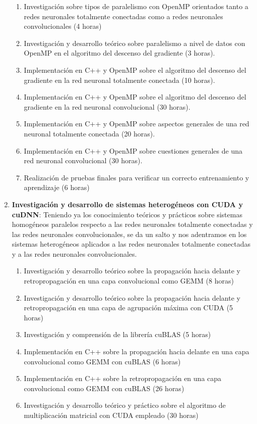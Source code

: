 \begin{enumerate}[label=\textbullet]
\begin{enumerate}[label=\textbullet]
		\item Investigación sobre tipos de paralelismo con OpenMP orientados tanto a redes neuronales totalmente conectadas como a redes neuronales convolucionales (4 horas)
		\item Investigación y desarrollo teórico sobre paralelismo a nivel de datos con OpenMP en el algoritmo del descenso del gradiente (3 horas).
		\item Implementación en C++ y OpenMP sobre el algoritmo del descenso del gradiente en la red neuronal totalmente conectada (10 horas).
		\item Implementación en C++ y OpenMP sobre el algoritmo del descenso del gradiente en la red neuronal convolucional (30 horas).
		\item Implementación en C++ y OpenMP sobre aspectos generales de una red neuronal totalmente conectada (20 horas).
		\item Implementación en C++ y OpenMP sobre cuestiones generales de una red neuronal convolucional (30 horas).
		\item Realización de pruebas finales para verificar un correcto entrenamiento y aprendizaje (6 horas)
	\end{enumerate}
	\item \textbf{Investigación y desarrollo de sistemas heterogéneos con CUDA y cuDNN}:
	Teniendo ya los conocimiento teóricos y prácticos sobre sistemas homogéneos paralelos respecto a las redes neuronales totalmente conectadas y las redes neuronales convolucionales, se da un salto y nos adentramos en los sistemas heterogéneos aplicados a las redes neuronales totalmente conectadas y a las redes neuronales convolucionales.
	\begin{enumerate}[label=\textbullet]
		\item Investigación y desarrollo teórico sobre la propagación hacia delante y retropropagación en una capa convolucional como GEMM (8 horas)
		\item Investigación y desarrollo teórico sobre la propagación hacia delante y retropropagación en una capa de agrupación máxima con CUDA (5 horas)
		\item Investigación y comprensión de la librería cuBLAS (5 horas)
		\item Implementación en C++ sobre la propagación hacia delante en una capa convolucional como GEMM con cuBLAS (6 horas)
		\item Implementación en C++ sobre la retropropagación en una capa convolucional como GEMM con cuBLAS (26 horas)
		\item Investigación y desarrollo teórico y práctico sobre el algoritmo de multiplicación matricial con CUDA empleado (30 horas)

\end{enumerate}
\end{enumerate}
